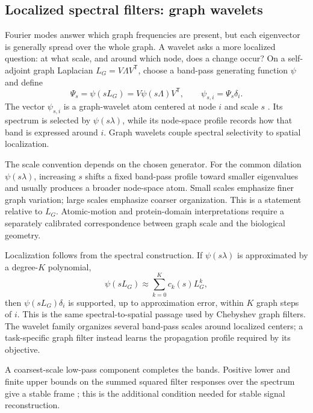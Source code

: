 \subsection{Localized spectral filters: graph wavelets}

Fourier modes answer which graph frequencies are present, but each eigenvector is generally spread
over the whole graph.  A wavelet asks a more localized question: at what scale, and around which
node, does a change occur?  On a self-adjoint graph Laplacian
$L_G=V\Lambda V^{\mathsf T}$, choose a band-pass generating function $\psi$ and define
\begin{equation}
\Psi_s
=\psi(sL_G)
=V\psi(s\Lambda)V^{\mathsf T},
\qquad
\psi_{s,i}=\Psi_s\delta_i.
\label{eq:graph-wavelet-atom}
\end{equation}
The vector $\psi_{s,i}$ is a graph-wavelet atom centered at node $i$ and scale $s$
\cite{hammond2011}.  Its spectrum is selected by $\psi(s\lambda)$, while its node-space profile
records how that band is expressed around $i$.  Graph wavelets couple spectral selectivity to
spatial localization.

The scale convention depends on the chosen generator.  For the common dilation
$\psi(s\lambda)$, increasing $s$ shifts a fixed band-pass profile toward smaller eigenvalues and
usually produces a broader node-space atom.  Small scales emphasize finer graph variation; large
scales emphasize coarser organization.  This is a statement relative to $L_G$.  Atomic-motion and
protein-domain interpretations require a separately calibrated correspondence between graph scale
and the biological geometry.

Localization follows from the spectral construction.  If $\psi(s\lambda)$ is approximated by a
degree-$K$ polynomial,
\begin{equation}
\psi(sL_G)\approx\sum_{k=0}^{K}c_k(s)L_G^k,
\label{eq:graph-wavelet-polynomial}
\end{equation}
then $\psi(sL_G)\delta_i$ is supported, up to approximation error, within $K$ graph steps of $i$.
This is the same spectral-to-spatial passage used by Chebyshev graph filters.  The wavelet family
organizes several band-pass scales around localized centers; a task-specific graph filter instead
learns the propagation profile required by its objective.

A coarsest-scale low-pass component completes the bands.  Positive lower and finite upper bounds
on the summed squared filter responses over the spectrum give a stable frame
\cite{hammond2011}; this is the additional condition needed for stable signal reconstruction.

